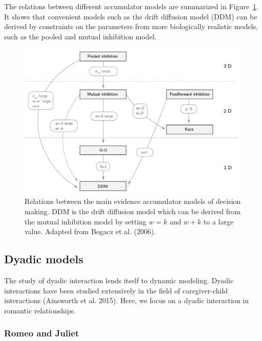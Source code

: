 \documentclass[
  a4paper,
  DIV=11,
  numbers=noendperiod,
  oneside]{scrreprt}
\begin{document}
The relations between different accumulator models are summarized in
Figure~\ref{fig-ch4n-img8-old-56}. It shows that convenient models such
as the drift diffusion model (DDM) can be derived by constraints on the
parameters from more biologically realistic models, such as the pooled
and mutual inhibition model.

\begin{figure}

{\centering \includegraphics{media/ch4n/ch4n-8__figure57.png}

}

\caption{\label{fig-ch4n-img8-old-56}Relations between the main evidence
accumulator models of decision making. DDM is the drift diffusion model
which can be derived from the mutual inhibition model by setting
\(w = k\) and \(w + k\) to a large value. Adapted from Bogacz et al.
(2006).}

\end{figure}

\hypertarget{sec-Dyadic-models}{%
\subsection{Dyadic models}\label{sec-Dyadic-models}}

The study of dyadic interaction lends itself to dynamic modeling. Dyadic
interactions have been studied extensively in the field of
caregiver-child interactions (Ainsworth et al. 2015). Here, we focus on
a dyadic interaction in romantic relationships.

\hypertarget{sec-Romeo-and-Juliet}{%
\subsubsection{Romeo and Juliet}\label{sec-Romeo-and-Juliet}}
\end{document}
